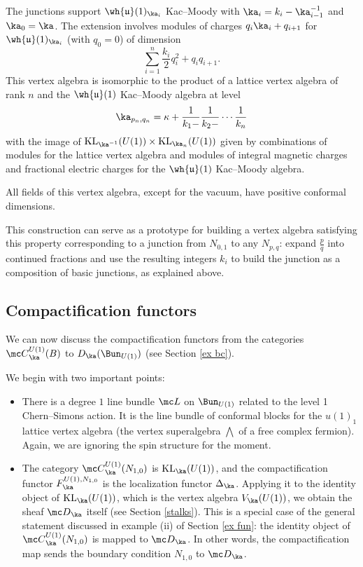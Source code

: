 \documentclass[11pt,reqno]{amsart}
\theoremstyle{plain}
\numberwithin{equation}{section}
\DeclareMathOperator{\KL}{KL}
\theoremstyle{definition}
\begin{document}
The junctions support $\wh{\mathfrak{u}}(1)_{\ka_i}$ Kac--Moody with
$\ka_i = k_i - \ka_{i-1}^{-1}$ and $\ka_0 = \ka$. The extension
involves modules of charges $q_{i} \ka_i + q_{i+1}$ for
$\wh{\mathfrak{u}}(1)_{\ka_i}$ (with $q_0=0$) of dimension
$$
\sum_{i=1}^n \frac{k_i}{2} q_i^2 + q_i q_{i+1}.
$$
This vertex algebra is isomorphic to the product of a lattice vertex
algebra of rank $n$ and the $\wh{\mathfrak{u}}(1)$ Kac--Moody algebra
at level
\begin{equation}   \label{kapq}
\ka_{p_n,q_n} = \kappa +\frac{1}{k_{1}-}\frac{1}{k_{2}-}\cdots
\frac{1}{k_{n}}
\end{equation}
with the image of $\KL_{\ka^{-1}}(U(1)) \times \KL_{\ka_n}(U(1))$
given by combinations of modules for the lattice vertex algebra and
modules of integral magnetic charges and fractional electric charges
for the $\wh{\mathfrak{u}}(1)$ Kac--Moody algebra.

All fields of this vertex algebra, except for the vacuum, have
positive conformal dimensions.

This construction can serve as a prototype for building a vertex
algebra satisfying this property corresponding to a junction from
$N_{0,1}$ to any $N_{p,q}$: expand $\frac{p}{q}$ into continued
fractions and use the resulting integers $k_i$ to build the junction
as a composition of basic junctions, as explained above.

\subsection{Compactification functors}

We can now discuss the compactification functors from the categories
${\mc C}^{U(1)}_\ka(B)$ to $D_{\ka}(\Bun_{U(1)})$ (see Section \ref{ex
bc}).

We begin with two important points:

\medskip

\begin{itemize}

\item There is a degree $1$ line bundle ${\mc L}$ on $\Bun_{U(1)}$
  related to the level 1 Chern--Simons action.  It is the line bundle
  of conformal blocks for the $u(1)_1$ lattice vertex algebra (the
  vertex superalgebra $\bigwedge$ of a free complex fermion). Again,
  we are ignoring the spin structure for the moment.

\medskip

\item The category ${\mc C}^{U(1)}_\ka(N_{1,0})$ is $\KL_\ka(U(1))$,
  and the compactification functor $F^{U(1),N_{1,0}}_\ka$ is the
  localization functor $\Delta_\ka$. Applying it to the identity
  object of $\KL_\ka(U(1))$, which is the vertex algebra
  $V_{\ka}(U(1))$, we obtain the sheaf ${\mc D}_\ka$ itself (see
  Section \ref{stalks}). This is a special case of the general
  statement discussed in example (ii) of Section \ref{ex fun}: the
  identity object of ${\mc C}^{U(1)}_\ka(N_{1,0})$ is mapped to ${\mc
    D}_\ka$. In other words, the compactification map sends the
  boundary condition $N_{1,0}$ to ${\mc D}_\ka$.

\end{itemize}
\end{document}
